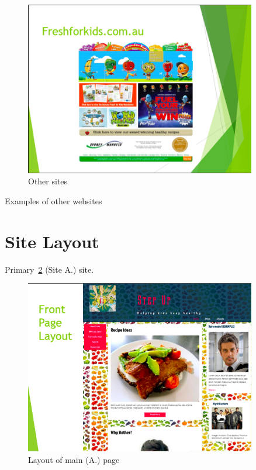 \documentclass[letterpaper,12pt]{article}
\begin{document}
\begin{figure}[ht!]
  \centering
  \includegraphics[width=0.9\textwidth]{assets/jpg/othersite_3}
  \caption{Other sites}
  \label{fig:othersites}
\end{figure}
\FloatBarrier

Examples of other websites

\section{Site Layout}

Primary~\ref{fig:layout-mainpage} (Site A.) site.

\begin{figure}[ht!]
  \centering
  \includegraphics[width=0.9\textwidth]{assets/jpg/layout_mainpage}
  \caption{Layout of main (A.) page}
  \label{fig:layout-mainpage}
\end{figure}
\FloatBarrier
\end{document}
